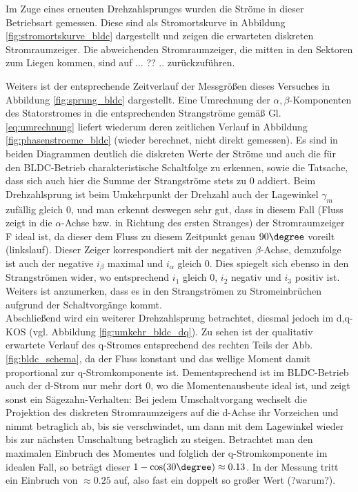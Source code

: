 \noindent Im Zuge eines erneuten Drehzahlsprunges wurden die Ströme in dieser Betriebsart gemessen. Diese sind als Stromortskurve in Abbildung \ref{fig:stromortskurve_bldc} dargestellt und zeigen die erwarteten diskreten Stromraumzeiger. Die abweichenden Stromraumzeiger, die mitten in den Sektoren zum Liegen kommen, sind auf ... ?? .. zurückzuführen.



\noindent Weiters ist der entsprechende Zeitverlauf der Messgrößen dieses Versuches in Abbildung \ref{fig:sprung_bldc} dargestellt. Eine Umrechnung der $\alpha, \beta$-Komponenten des Statorstromes in die entsprechenden Strangströme gemäß Gl. \ref{eq:umrechnung} liefert wiederum deren zeitlichen Verlauf in Abbildung \ref{fig:phasenstroeme_bldc} (wieder berechnet, nicht direkt gemessen). Es sind in beiden Diagrammen deutlich die diskreten Werte der Ströme und auch die für den BLDC-Betrieb charakteristische Schaltfolge zu erkennen, sowie die Tatsache, dass sich auch hier die Summe der Strangströme stets zu 0 addiert. Beim Drehzahlsprung ist beim Umkehrpunkt der Drehzahl auch der Lagewinkel $\gamma_m$ zufällig gleich 0, und man erkennt deswegen sehr gut, dass in diesem Fall (Fluss zeigt in die $\alpha$-Achse bzw. in Richtung des ersten Stranges) der Stromraumzeiger F ideal ist, da dieser dem Fluss zu diesem Zeitpunkt genau $90\degree$ voreilt (linkslauf). Dieser Zeiger korrespondiert mit der negativen $\beta$-Achse, demzufolge ist auch der negative $i_{\beta}$ maximal und $i_{\alpha}$ gleich 0. Dies spiegelt sich ebenso in den Strangströmen wider, wo entsprechend $i_1$ gleich 0, $i_2$ negativ und $i_3$ positiv ist. Weiters ist anzumerken, dass es in den Strangströmen zu Stromeinbrüchen aufgrund der Schaltvorgänge kommt.\\
\noindent Abschließend wird ein weiterer Drehzahlsprung betrachtet, diesmal jedoch im d,q-KOS (vgl. Abbildung \ref{fig:umkehr_bldc_dq}). Zu sehen ist der qualitativ erwartete Verlauf des q-Stromes entsprechend des rechten Teils der Abb. \ref{fig:bldc_schema}, da der Fluss konstant und das wellige Moment damit proportional zur q-Stromkomponente ist. Dementsprechend ist im BLDC-Betrieb auch der d-Strom nur mehr dort 0, wo die Momentenausbeute ideal ist, und zeigt sonst ein Sägezahn-Verhalten: Bei jedem Umschaltvorgang wechselt die Projektion des diskreten Stromraumzeigers auf die d-Achse ihr Vorzeichen und nimmt betraglich ab, bis sie verschwindet, um dann mit dem Lagewinkel wieder bis zur nächsten Umschaltung betraglich zu steigen. Betrachtet man den maximalen Einbruch des Momentes und folglich der q-Stromkomponente im idealen Fall, so beträgt dieser $1-\cos(30\degree) \approx 0.13$. In der Messung tritt ein Einbruch von $\approx 0.25$ auf, also fast ein doppelt so großer Wert (?warum?).





